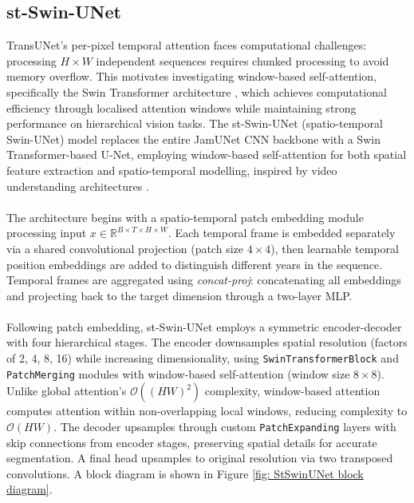 \documentclass[10pt,oneside,a4paper,english]{article}
\begin{document}
\subsection{st-Swin-UNet}
TransUNet's per-pixel temporal attention faces computational challenges: processing $H \times W$ independent sequences requires chunked processing to avoid memory overflow. This motivates investigating window-based self-attention, specifically the Swin Transformer architecture \cite{liu2021swin}, which achieves computational efficiency through localised attention windows while maintaining strong performance on hierarchical vision tasks. The st-Swin-UNet (spatio-temporal Swin-UNet) model replaces the entire JamUNet CNN backbone with a Swin Transformer-based U-Net, employing window-based self-attention for both spatial feature extraction and spatio-temporal modelling, inspired by video understanding architectures \cite{liu2022video}. \\
\\
The architecture begins with a spatio-temporal patch embedding module processing input $x \in \mathbb{R}^{B \times T \times H \times W}$. Each temporal frame is embedded separately via a shared convolutional projection (patch size $4 \times 4$), then learnable temporal position embeddings are added to distinguish different years in the sequence. Temporal frames are aggregated using \textit{concat-proj}: concatenating all embeddings and projecting back to the target dimension through a two-layer MLP. \\
\\
Following patch embedding, st-Swin-UNet employs a symmetric encoder-decoder with four hierarchical stages. The encoder downsamples spatial resolution (factors of 2, 4, 8, 16) while increasing dimensionality, using \texttt{SwinTransformerBlock} and \texttt{PatchMerging} modules with window-based self-attention (window size $8 \times 8$). Unlike global attention's $\mathcal{O}((HW)^2)$ complexity, window-based attention computes attention within non-overlapping local windows, reducing complexity to $\mathcal{O}(HW)$. The decoder upsamples through custom \texttt{PatchExpanding} layers with skip connections from encoder stages, preserving spatial details for accurate segmentation. A final head upsamples to original resolution via two transposed convolutions. A block diagram is shown in Figure \ref{fig: StSwinUNet block diagram}.
\end{document}
